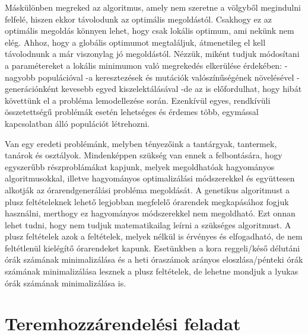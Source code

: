 \documentclass[a4paper,12pt]{article}
\begin{document}
Máskülönben megreked az algoritmus, amely nem szeretne a völgyből megindulni felfelé, hiszen 
ekkor távolodunk az optimális megoldástól. Csakhogy ez az optimális megoldás könnyen lehet,
hogy csak lokális optimum, ami nekünk nem elég. Ahhoz, hogy a globális optimumot megtaláljuk,
átmenetileg el kell távolodnunk a már viszonylag jó megoldástól. Nézzük, miként tudjuk
módosítani a paramétereket a lokális minimumon való megrekedés elkerülése érdekében:
-nagyobb populációval
-a keresztezések és mutációk valószínűségének növelésével
-generációnként kevesebb egyed kiszelektálásával
-de az is előfordulhat, hogy hibát követtünk el a probléma lemodellezése során.
Ezenkívül egyes, rendkívüli összetettségű problémák esetén lehetséges és érdemes több, 
egymással kapcsolatban álló populációt létrehozni.

Van egy eredeti problémánk, melyben tényezőink a tantárgyak, tantermek, tanárok és 
osztályok. Mindenképpen szükség van ennek a felbontására, hogy egyszerűbb részproblámákat kapjunk, melyek megoldhatóak hagyományos algoritmusokkal, illetve hagyományos optimalizálási módszerekkel és együttesen alkotják az órarendgenerálási probléma megoldását. A genetikus algoritmust a plusz feltételeknek lehető legjobban megfelelő órarendek megkapásához fogjuk használni, merthogy ez hagyományos módszerekkel nem megoldható. Ezt onnan lehet tudni, hogy nem tudjuk matematikailag leírni a szükséges algoritmust. A plusz feltételek azok a feltételek, melyek nélkül is érvényes és elfogadható, de nem feltétlenül kielégítő órarendeket kapunk. Esetünkben a kora reggeli/késő délutáni órák számának minimalizálása és a heti óraszámok arányos eloszlása/pénteki órák számának minimalizálása lesznek a plusz feltételek, de lehetne mondjuk a lyukas órák számának minimalizálása is.

\section{Teremhozzárendelési feladat}
\end{document}

